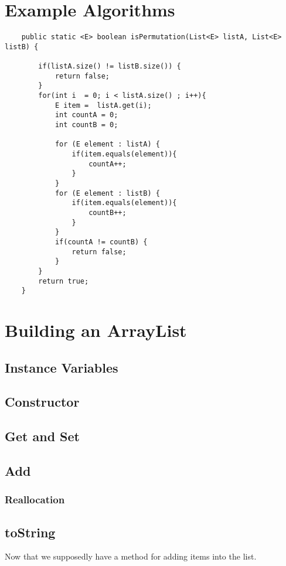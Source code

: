 \section{Example Algorithms}


\begin{verbatim}
	public static <E> boolean isPermutation(List<E> listA, List<E> listB) {
		
		if(listA.size() != listB.size()) {
			return false;
		}
		for(int i  = 0; i < listA.size() ; i++){
			E item =  listA.get(i);
			int countA = 0;
			int countB = 0;
			
			for (E element : listA) {
				if(item.equals(element)){
					countA++;
				}
			}
			for (E element : listB) {
				if(item.equals(element)){
					countB++;
				}
			}
			if(countA != countB) {
				return false;
			}
		}
		return true;
	}
\end{verbatim}



\section{Building an ArrayList}
\label{buildingArraylist}


\subsection{Instance Variables}

\subsection{Constructor}

\subsection{Get and Set}

\subsection{Add}

\subsubsection{Reallocation}

\subsection{toString}
Now that we supposedly have a method for adding items into the list.


